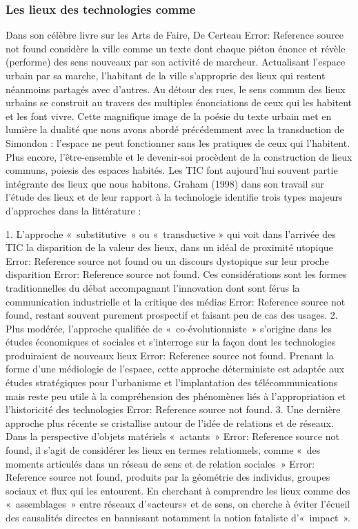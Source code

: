 \subsubsection{Les lieux des technologies comme }
Dans son célèbre livre sur les Arts de Faire, De Certeau Error: Reference source not found considère la ville comme un texte dont chaque piéton énonce et révèle (performe) des sens nouveaux par son activité de marcheur. Actualisant l’espace urbain par sa marche, l’habitant de la ville s’approprie des lieux qui restent néanmoins partagés avec d’autres. Au détour des rues, le sens commun des lieux urbains se construit au travers des multiples énonciations de ceux qui les habitent et les font vivre. Cette magnifique image de la poésie du texte urbain met en lumière la dualité que nous avons abordé précédemment avec la transduction de Simondon : l’espace ne peut fonctionner sans les pratiques de ceux qui l’habitent. Plus encore, l’être-ensemble et le devenir-soi procèdent de la construction de lieux communs, poiesis des espaces habités. Les TIC font aujourd’hui souvent partie intégrante des lieux que nous habitons. Graham (1998) dans son travail sur l’étude des lieux et de leur rapport à la technologie identifie trois types majeurs d’approches dans la littérature :

1. L’approche « substitutive » ou « transductive » qui voit dans l’arrivée des TIC la disparition de la valeur des lieux, dans un idéal de proximité utopique Error: Reference source not found ou un discours dystopique sur leur proche disparition Error: Reference source not found. Ces considérations sont les formes traditionnelles du débat accompagnant l’innovation dont sont férus la communication industrielle et la critique des médias Error: Reference source not found, restant souvent purement prospectif et faisant peu de cas des usages.
2. Plus modérée, l’approche qualifiée de « co-évolutionniste » s’origine dans les études économiques et sociales et s’interroge sur la façon dont les technologies produiraient de nouveaux lieux Error: Reference source not found. Prenant la forme d’une médiologie de l’espace, cette approche déterministe est adaptée aux études stratégiques pour l’urbanisme et l’implantation des télécommunications mais reste peu utile à la compréhension des phénomènes liés à l’appropriation et l’historicité des technologies Error: Reference source not found.
3. Une dernière approche plus récente se cristallise autour de l’idée de relations et de réseaux. Dans la perspective d’objets matériels « actants » Error: Reference source not found, il s’agit de considérer les lieux en termes relationnels, comme « des moments articulés dans un réseau de sens et de relation sociales » Error: Reference source not found, produits par la géométrie des individus, groupes sociaux et flux qui les entourent. En cherchant à comprendre les lieux comme des « assemblages » entre réseaux d’«acteurs» et de sens, on cherche à éviter l’écueil des causalités directes en bannissant notamment la notion fataliste d’« impact ».

